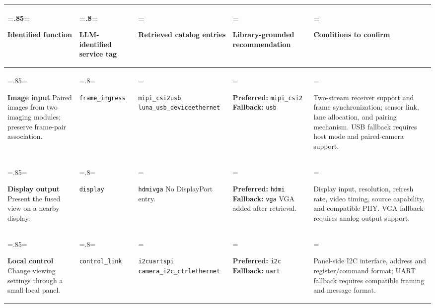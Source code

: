 \begin{tabularx}{\linewidth}{@{}
  >{\hsize=.85\hsize\linewidth=\hsize\raggedright\arraybackslash}X
  >{\hsize=.8\hsize\linewidth=\hsize\raggedright\arraybackslash}X
  >{\hsize=1.05\hsize\linewidth=\hsize\raggedright\arraybackslash}X
  >{\hsize=1.0\hsize\linewidth=\hsize\raggedright\arraybackslash}X
  >{\hsize=1.3\hsize\linewidth=\hsize\raggedright\arraybackslash}X@{}}
\toprule
\textbf{Identified function} &
\textbf{LLM-identified service tag} &
\textbf{Retrieved catalog entries} &
\textbf{Library-grounded recommendation} &
\textbf{Conditions to confirm} \\
\midrule
\textbf{Image input}\newline
Paired images from two imaging modules; preserve frame-pair association.
& \texttt{frame\_ingress}
& \texttt{mipi\_csi2}\newline \texttt{usb}\newline
  \texttt{luna\_usb\_device}\newline \texttt{ethernet}
& \textbf{Preferred:} \texttt{mipi\_csi2}\newline
  \textbf{Fallback:} \texttt{usb}
& Two-stream receiver support and frame synchronization; sensor link,
  lane allocation, and pairing mechanism. USB fallback requires host mode
  and paired-camera support. \\
\midrule
\textbf{Display output}\newline
Present the fused view on a nearby display.
& \texttt{display}
& \texttt{hdmi}\newline \texttt{vga}\newline
  No DisplayPort entry.
& \textbf{Preferred:} \texttt{hdmi}\newline
  \textbf{Fallback:} \texttt{vga}\newline
  VGA added after retrieval.
& Display input, resolution, refresh rate, video timing, source capability,
  and compatible PHY. VGA fallback requires analog output support. \\
\midrule
\textbf{Local control}\newline
Change viewing settings through a small local panel.
& \texttt{control\_link}
& \texttt{i2c}\newline \texttt{uart}\newline \texttt{spi}\newline
  \texttt{camera\_i2c\_ctrl}\newline \texttt{ethernet}
& \textbf{Preferred:} \texttt{i2c}\newline
  \textbf{Fallback:} \texttt{uart}
& Panel-side I2C interface, address and register/command format;
  UART fallback requires compatible framing and message format. \\
\bottomrule
\end{tabularx}
\endgroup
